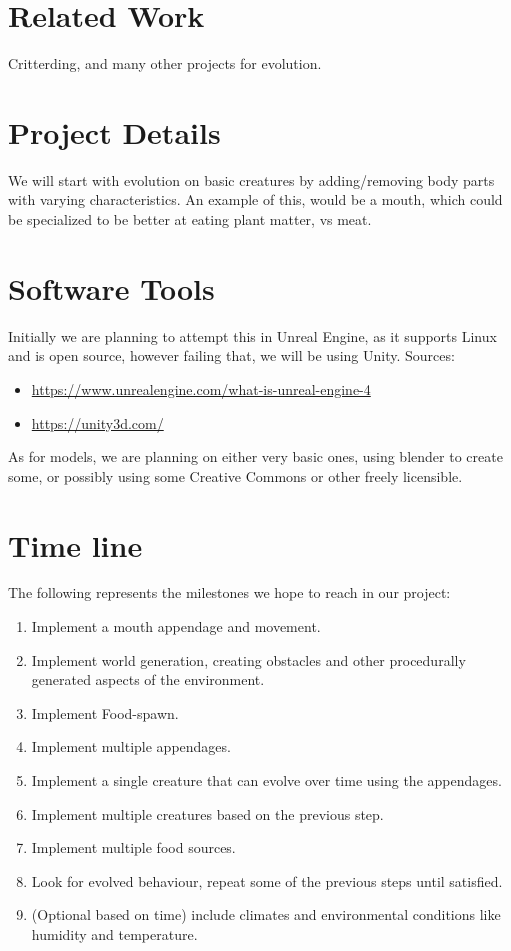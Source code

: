 \documentclass[runningheads]{llncs}
\begin{document}
\section{Related Work}
Critterding, and many other projects for evolution.

\section{Project Details}
We will start with evolution on basic creatures by adding/removing body parts with varying characteristics. An example of this, would be a mouth, which could be specialized to be better at eating plant matter, vs meat. 

\section{Software Tools}
Initially we are planning to attempt this in Unreal Engine, as it supports Linux and is open source, however failing that, we will be using Unity.
Sources: 
\begin{itemize}
\item \url{https://www.unrealengine.com/what-is-unreal-engine-4}
\item \url{https://unity3d.com/}
\end{itemize}
As for models, we are planning on either very basic ones, using blender to create some, or possibly using some Creative Commons or other freely licensible.

\section{Time line}
The following represents the milestones we hope to reach in our project:
\begin{enumerate}
\item Implement a mouth appendage and movement.
\item Implement world generation, creating obstacles and other procedurally generated aspects of the environment.
\item Implement Food-spawn.
\item Implement multiple appendages.
\item Implement a single creature that can evolve over time using the appendages.
\item Implement multiple creatures based on the previous step.
\item Implement multiple food sources.
\item Look for evolved behaviour, repeat some of the previous steps until satisfied.
\item (Optional based on time) include climates and environmental conditions like humidity and temperature.
\end{enumerate}
\end{document}
